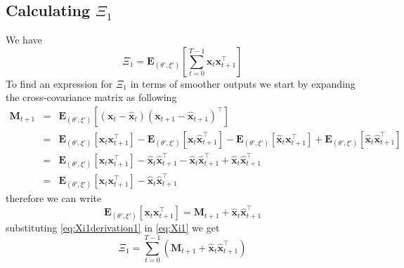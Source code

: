 \documentclass[]{article}
\begin{document}
\subsection*{Calculating $\Xi_1$}
We have
\begin{equation}\label{eq:Xi1}
 \Xi_1=\mathbf E_{(\theta',\xi')}\left[\sum_{t=0}^{T-1}\mathbf x_t\mathbf x_{t+1}^\top\right]
\end{equation}
To find an expression for $\Xi_1$ in terms of smoother outputs we start by expanding the cross-covariance matrix as following
\begin{eqnarray}
 \mathbf M_{t+1}&=&\mathbf E_{(\theta',\xi')}\left[(\mathbf x_t-\mathbf{\hat x}_t)(\mathbf x_{t+1}-\mathbf{\hat x}_{t+1})^\top\right] \nonumber \\
&=&\mathbf E_{(\theta',\xi')}\left[\mathbf x_t\mathbf x_{t+1}^\top\right]-\mathbf E_{(\theta',\xi')}\left[\mathbf x_t\mathbf{\hat x}_{t+1}^\top\right]-\mathbf E_{(\theta',\xi')}\left[\mathbf{\hat x}_t\mathbf x_{t+1}^\top\right]+\mathbf E_{(\theta',\xi')}\left[\mathbf{\hat x}_t\mathbf{\hat x}_{t+1}^\top\right] \nonumber \\
&=&\mathbf E_{(\theta',\xi')}\left[\mathbf x_t\mathbf x_{t+1}^\top\right]-\mathbf {\hat x}_t\mathbf{\hat x}_{t+1}^\top-\mathbf {\hat x}_t\mathbf{\hat x}_{t+1}^\top+\mathbf {\hat x}_t\mathbf{\hat x}_{t+1}^\top \nonumber \\
&=&\mathbf E_{(\theta',\xi')}\left[\mathbf x_t\mathbf x_{t+1}^\top\right]-\mathbf {\hat x}_t\mathbf{\hat x}_{t+1}^\top
\end{eqnarray}
therefore we can write
\begin{equation}\label{eq:Xi1derivation1}
 \mathbf E_{(\theta',\xi')}\left[\mathbf x_t\mathbf x_{t+1}^\top\right]=\mathbf M_{t+1}+\mathbf {\hat x}_t\mathbf{\hat x}_{t+1}^\top
\end{equation}
substituting \ref{eq:Xi1derivation1} in \ref{eq:Xi1} we get
\begin{equation}
 \Xi_1=\sum_{t=0}^{T-1}\left(\mathbf M_{t+1}+\mathbf{\hat x}_t\mathbf{\hat x}_{t+1}^\top\right)
\end{equation}
\end{document}
